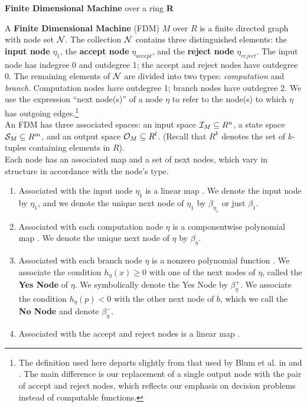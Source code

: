 \begin{definition}{\textbf{Finite Dimensional Machine} over a ring
    \textbf{R}}
  
  A \textbf{Finite Dimensional Machine} (FDM) $M$ over $R$ is a finite
  directed graph with node set $\mathcal{N}$.  The collection $\mathcal{N}$
  contains three distinguished elements: the \textbf{input node}
  $\eta_1$, the \textbf{accept node} $\eta_{accept}$, and the
  \textbf{reject node} $\eta_{reject}$. The input node has indegree 0
  and outdegree 1; the accept and reject nodes have outdegree 0.  The
  remaining elements of $\mathcal{N}$ are divided into two types:
  \emph{computation} and \emph{branch}. Computation nodes have
  outdegree 1; branch nodes have outdegree 2.  We use the expression
  ``next node(s)'' of a node $\eta$ to refer to the node(s) to which
  $\eta$ has outgoing edges.\footnote{The definition used here departs
    slightly from that used by Blum et al. in \cite{B98} and
    \cite{B89}.  The main difference is our replacement of a single
    output node with the pair of accept and reject nodes, which
    reflects our emphasis on decision problems instead of computable
    functions.}\\
  
  An FDM has three associated spaces: an input space $\mathcal{I}_M
  \subseteq R^n$, a state space $\mathcal{S}_M \subseteq R^m$, and an
  output space $\mathcal{O}_M \subseteq R^l$.  (Recall that $R^k$
  denotes the set of $k$-tuples containing elements in $R$).\\

  Each node has an associated map and a set of next nodes, which vary
  in structure in accordance with the node's type.

  \begin{enumerate}
  \item Associated with the input node $\eta_1$ is a linear map
    . We denote the input node
    by $\eta_1$, and we denote the unique next node of $\eta_1$ by
    $\beta_{\eta_1}$ or just $\beta_1$.
    
  \item Associated with each computation node $\eta$ is a
    componentwise polynomial map
    . We denote the
    unique next node of $\eta$ by $\beta_\eta$.
    
  \item Associated with each branch node $\eta$ is a nonzero
    polynomial function .  We
    associate the condition $h_\eta(x) \geq 0$ with one of the next
    nodes of $\eta$, called the \textbf{Yes Node} of $\eta$.  We
    symbolically denote the Yes Node by $\beta_\eta^+$. We associate
    the condition $h_\eta(p) < 0$ with the other next node of $b$,
    which we call the \textbf{No Node} and denote $\beta_\eta^-$.
    
  \item Associated with the accept and reject nodes is a linear map
    .
  \end{enumerate}
\end{definition}

